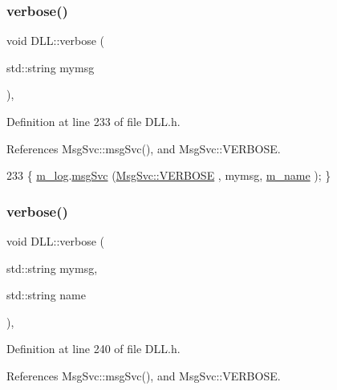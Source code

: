 \subsubsection{\texorpdfstring{verbose()}{verbose()}\hspace{0.1cm}{\footnotesize\ttfamily [1/2]}}
{\footnotesize\ttfamily void D\+L\+L\+::verbose (\begin{DoxyParamCaption}\item[{std\+::string}]{mymsg }\end{DoxyParamCaption})\hspace{0.3cm}{\ttfamily [inline]}, {\ttfamily [private]}}



Definition at line 233 of file D\+L\+L.\+h.



References Msg\+Svc\+::msg\+Svc(), and Msg\+Svc\+::\+V\+E\+R\+B\+O\+SE.


\begin{DoxyCode}
233 \{ \hyperlink{classDLL_a6e66cd993e2d142b48691557ce8e4047}{m\_log}.\hyperlink{classMsgSvc_ad25f18047920cc59a314e5098259711c}{msgSvc} (\hyperlink{classMsgSvc_ae671eb7301996cd049d2da8a65925926af655256b06494ade5ba830abe5401ec9}{MsgSvc::VERBOSE} , mymsg, \hyperlink{classDLL_ad5e4d36d8c2575447f73acc2a703b405}{m\_name} ); \}
\end{DoxyCode}
\mbox{\label{classDLL_a721fa58107b11bb96181219f06f517e3}} 
\subsubsection{\texorpdfstring{verbose()}{verbose()}\hspace{0.1cm}{\footnotesize\ttfamily [2/2]}}
{\footnotesize\ttfamily void D\+L\+L\+::verbose (\begin{DoxyParamCaption}\item[{std\+::string}]{mymsg,  }\item[{std\+::string}]{name }\end{DoxyParamCaption})\hspace{0.3cm}{\ttfamily [inline]}, {\ttfamily [private]}}



Definition at line 240 of file D\+L\+L.\+h.



References Msg\+Svc\+::msg\+Svc(), and Msg\+Svc\+::\+V\+E\+R\+B\+O\+SE.


